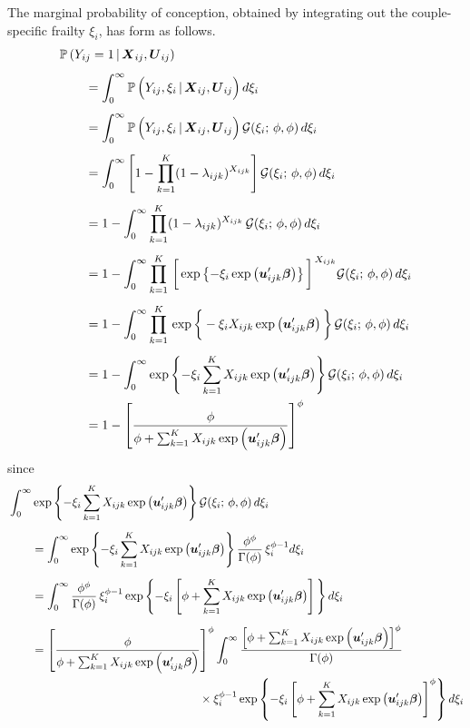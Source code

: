 \documentclass[11pt]{article}
\newcommand{\prob}{\mathbb{P}\,}
\renewcommand{\vec}{\boldsymbol}
\newcommand{\cbar}{\,|\,}
\begin{document}
The marginal probability of conception, obtained by integrating out the couple-specific frailty $\xi_i$, has form as follows.
\begin{align*} \MoveEqLeft
\prob (Y_{ij} = 1 \cbar \vec{X}_{ij}, \vec{U}_{ij}) \\[1ex]
&= \int_0^\infty \prob \Big( Y_{ij}, \xi_i \cbar \vec{X}_{ij}, \vec{U}_{ij} \Big)\, d\xi_i \\[1ex]
&= \int_0^\infty \prob \Big( Y_{ij}, \xi_i \cbar \vec{X}_{ij}, \vec{U}_{ij} \Big)\, \mathcal{G}(\xi_i;\, \phi,\phi)\, d\xi_i \\[1ex]
&= \int_0^\infty \left[ 1 - \prod_{k=1}^K (1 - \lambda_{ijk})^{X_{ijk}} \right] \mathcal{G}(\xi_i;\, \phi,\phi)\, d\xi_i \\[1ex]
&= 1 - \int_0^\infty \prod_{k=1}^K (1 - \lambda_{ijk})^{X_{ijk}}\, \mathcal{G}(\xi_i;\, \phi,\phi)\, d\xi_i \\[1ex]
&= 1 - \int_0^\infty \prod_{k=1}^K\, \bigg[ \exp\left\{ -\xi_i \exp\left( \vec{u}_{ijk}^\prime \vec{\beta} \right)\right\} \bigg]^{\,X_{ijk}} \mathcal{G}(\xi_i;\, \phi,\phi)\, d\xi_i \\[1ex]
&= 1 - \int_0^\infty \prod_{k=1}^K\, \exp\bigg\{ -\xi_i X_{ijk} \exp\left( \vec{u}_{ijk}^\prime \vec{\beta} \right)\bigg\}\, \mathcal{G}(\xi_i;\, \phi,\phi)\, d\xi_i \\[1ex]
&= 1 - \int_0^\infty \exp\left\{ -\xi_i \sum_{k=1}^K X_{ijk} \exp\left( \vec{u}_{ijk}^\prime \vec{\beta} \right)\right\} \mathcal{G}(\xi_i;\, \phi,\phi)\, d\xi_i \\
&= 1 - \left[ \frac{ \phi }{ \phi + \sum_{k=1}^K X_{ijk} \exp\left( \vec{u}_{ijk}^\prime \vec{\beta} \right) } \right]^\phi
\end{align*}
since
\begin{align*} \MoveEqLeft
\int_0^\infty \exp\left\{ -\xi_i \sum_{k=1}^K X_{ijk} \exp\left( \vec{u}_{ijk}^\prime \vec{\beta} \right)\right\} \mathcal{G}(\xi_i;\, \phi,\phi)\, d\xi_i \\[1ex]
&= \int_0^\infty \exp\left\{ -\xi_i \sum_{k=1}^K X_{ijk} \exp\left( \vec{u}_{ijk}^\prime \vec{\beta} \right)\right\} \frac{ \phi^\phi }{ \Gamma(\phi) }\, \xi_i^{\phi-1} d\xi_i \\[1ex]
&= \int_0^\infty \frac{ \phi^\phi }{ \Gamma(\phi) }\, \xi_i^{\phi-1} \exp\left\{ -\xi_i \left[ \phi + \sum_{k=1}^K X_{ijk} \exp\left( \vec{u}_{ijk}^\prime \vec{\beta} \right) \right]\, \right\} d\xi_i \\[1ex]
&= \left[ \frac{ \phi }{ \phi + \sum_{k=1}^K X_{ijk} \exp\left( \vec{u}_{ijk}^\prime \vec{\beta} \right) } \right]^\phi \int_0^\infty \frac{ \left[ \phi + \sum_{k=1}^K X_{ijk} \exp\left( \vec{u}_{ijk}^\prime \vec{\beta} \right) \right]^\phi }{ \Gamma(\phi) } \\
& \hspace{50mm} \times \xi_i^{\phi-1} \exp \left\{ -\xi_i \left[ \phi + \sum_{k=1}^K X_{ijk} \exp\left( \vec{u}_{ijk}^\prime \vec{\beta} \right) \right]^\phi \right\} d\xi_i
\end{align*}
\end{document}
